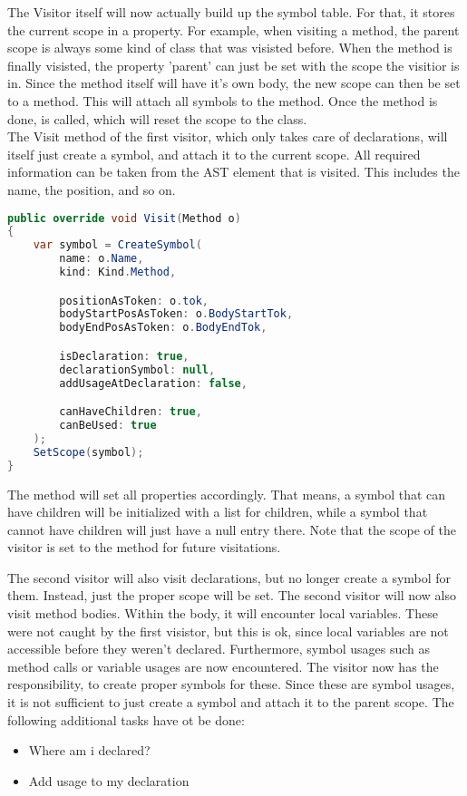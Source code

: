 The Visitor itself will now actually build up the symbol table. For that, it stores the current scope in a property. For example, when visiting a method, the parent scope is always some kind of class that was visisted before. When the method is finally visisted, the property 'parent' can just be set with the scope the visitior is in. Since the method itself will have it's own body, the new scope can then be set to a method. This will attach all symbols to the method. Once the method is done,  is called, which will reset the scope to the class.\\

The Visit method of the first visitor, which only takes care of declarations, will itself just create a symbol, and attach it to the current scope. All required information can be taken from the AST element that is visited. This includes the name, the position, and so on.\\

\begin{lstlisting}[language=csharp, caption={Visiting a Method}, captionpos=b, label={lst:visitorvisit1}]
public override void Visit(Method o)
{
    var symbol = CreateSymbol(
        name: o.Name,
        kind: Kind.Method,

        positionAsToken: o.tok,
        bodyStartPosAsToken: o.BodyStartTok,
        bodyEndPosAsToken: o.BodyEndTok,

        isDeclaration: true,
        declarationSymbol: null,
        addUsageAtDeclaration: false,

        canHaveChildren: true,
        canBeUsed: true
    );
    SetScope(symbol);
}
\end{lstlisting}

The  method will set all properties accordingly. That means, a symbol that can have children will be initialized with a list for children, while a symbol that cannot have children will just have a null entry there. Note that the scope of the visitor is set to the method for future visitations.

The second visitor will also visit declarations, but no longer create a symbol for them. Instead, just the proper scope will be set. The second visitor will now also visit method bodies. Within the body, it will encounter local variables. These were not caught by the first visistor, but this is ok, since local variables are not accessible before they weren't declared.  Furthermore, symbol usages such as method calls or variable usages are now encountered. The visitor now has the responsibility, to create proper symbols for these. Since these are symbol usages, it is not sufficient to just create a symbol and attach it to the parent scope. The following additional tasks have ot be done:
\begin{itemize}
    \item Where am i declared?
    \item Add usage to my declaration
\end{itemize}

